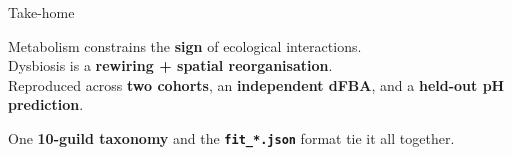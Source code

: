 \documentclass[
  ignorenonframetext,
  aspectratio=169,
]{beamer}
\begin{document}
\begin{frame}[fragile]{Take-home}
\protect\hypertarget{take-home}{}
\begin{center}
\large
Metabolism constrains the \textbf{sign} of ecological interactions.\\[0.3em]
Dysbiosis is a \textbf{rewiring + spatial reorganisation}.\\[0.3em]
Reproduced across \textbf{two cohorts}, an \textbf{independent dFBA},
and a \textbf{held-out pH prediction}.
\end{center}

\vspace{0.6em}

One \textbf{10-guild taxonomy} and the \textbf{\texttt{fit\_*.json}}
format tie it all together.
\end{frame}
\end{document}
